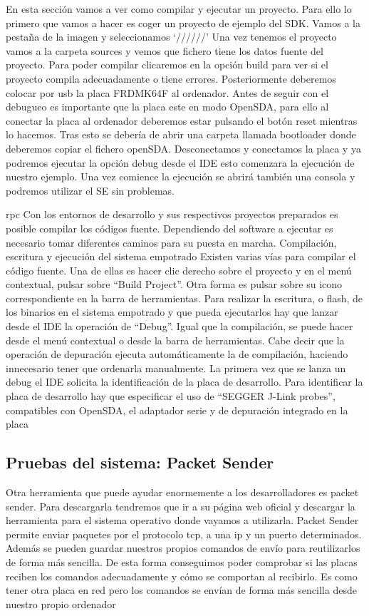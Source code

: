 En esta sección vamos a ver como compilar y ejecutar un proyecto. Para ello lo primero que vamos a hacer es coger un proyecto de ejemplo del SDK. Vamos a la pestaña de la imagen y seleccionamos ‘//////’
\imagen{}
Una vez tenemos el proyecto vamos a la carpeta sources y vemos que fichero tiene los datos fuente del proyecto. Para poder compilar clicaremos en la opción build para ver si el proyecto compila adecuadamente o tiene errores. Posteriormente deberemos colocar por usb la placa FRDMK64F al ordenador. Antes de seguir con el debugueo es importante que la placa este en modo OpenSDA, para ello al conectar la placa al ordenador deberemos estar pulsando el botón reset mientras lo hacemos. Tras esto se debería de abrir una carpeta llamada bootloader donde deberemos copiar el fichero openSDA. Desconectamos y conectamos la placa y ya podremos ejecutar la opción debug desde el IDE esto comenzara la ejecución de nuestro ejemplo. Una vez comience la ejecución se abrirá también una consola y podremos utilizar el SE sin problemas.



rpc
Con los entornos de desarrollo y sus respectivos proyectos preparados es
posible compilar los códigos fuente. Dependiendo del software a ejecutar es
necesario tomar diferentes caminos para su puesta en marcha.
Compilación, escritura y ejecución del sistema empotrado
Existen varias vías para compilar el código fuente. Una de ellas es hacer
clic derecho sobre el proyecto y en el menú contextual, pulsar sobre “Build
Project”. Otra forma es pulsar sobre su icono correspondiente en la barra de
herramientas.
Para realizar la escritura, o flash, de los binarios en el sistema empotrado
y que pueda ejecutarlos hay que lanzar desde el IDE la operación de “Debug”.
Igual que la compilación, se puede hacer desde el menú contextual o desde
la barra de herramientas. Cabe decir que la operación de depuración ejecuta
automáticamente la de compilación, haciendo innecesario tener que ordenarla
manualmente.
La primera vez que se lanza un debug el IDE solicita la identificación
de la placa de desarrollo. Para identificar la placa de desarrollo hay que
especificar el uso de “SEGGER J-Link probes”, compatibles con OpenSDA,
el adaptador serie y de depuración integrado en la placa

\subsection{Pruebas del sistema: Packet Sender}
Otra herramienta que puede ayudar enormemente a los desarrolladores es packet sender. Para descargarla tendremos que ir a su página web oficial y descargar la herramienta para el sistema operativo donde vayamos a utilizarla. Packet Sender permite enviar paquetes por el protocolo tcp, a una ip y un puerto determinados. Además se pueden guardar nuestros propios comandos de envío para reutilizarlos de forma más sencilla. De esta forma conseguimos poder comprobar si las placas reciben los comandos adecuadamente y cómo se comportan al recibirlo. Es como tener otra placa en red pero los comandos se envían de forma más sencilla desde nuestro propio ordenador

